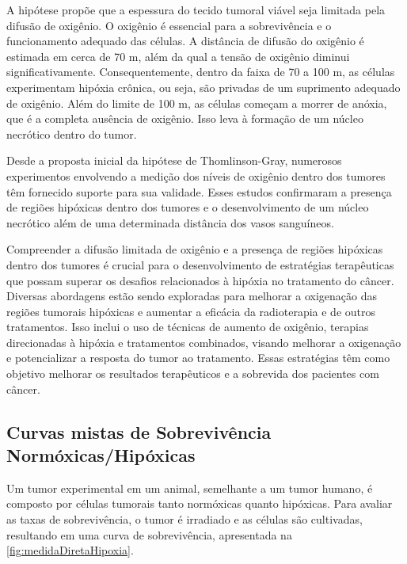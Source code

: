 \documentclass[11pt,a4paper]{article}
\begin{document}
	A hipótese propõe que a espessura do tecido tumoral viável seja limitada pela difusão de oxigênio. O oxigênio é essencial para a sobrevivência e o funcionamento adequado das células. A distância de difusão do oxigênio é estimada em cerca de 70 \mu m, além da qual a tensão de oxigênio diminui significativamente. Consequentemente, dentro da faixa de 70 a 100 \mu m, as células experimentam hipóxia crônica, ou seja, são privadas de um suprimento adequado de oxigênio. Além do limite de 100 \mu m, as células começam a morrer de anóxia, que é a completa ausência de oxigênio. Isso leva à formação de um núcleo necrótico dentro do tumor.

	Desde a proposta inicial da hipótese de Thomlinson-Gray, numerosos experimentos envolvendo a medição dos níveis de oxigênio dentro dos tumores têm fornecido suporte para sua validade. Esses estudos confirmaram a presença de regiões hipóxicas dentro dos tumores e o desenvolvimento de um núcleo necrótico além de uma determinada distância dos vasos sanguíneos.

	Compreender a difusão limitada de oxigênio e a presença de regiões hipóxicas dentro dos tumores é crucial para o desenvolvimento de estratégias terapêuticas que possam superar os desafios relacionados à hipóxia no tratamento do câncer. Diversas abordagens estão sendo exploradas para melhorar a oxigenação das regiões tumorais hipóxicas e aumentar a eficácia da radioterapia e de outros tratamentos. Isso inclui o uso de técnicas de aumento de oxigênio, terapias direcionadas à hipóxia e tratamentos combinados, visando melhorar a oxigenação e potencializar a resposta do tumor ao tratamento. Essas estratégias têm como objetivo melhorar os resultados terapêuticos e a sobrevida dos pacientes com câncer.

\subsection*{Curvas mistas de Sobrevivência Normóxicas/Hipóxicas}

	Um tumor experimental em um animal, semelhante a um tumor humano, é composto por células tumorais tanto normóxicas quanto hipóxicas. Para avaliar as taxas de sobrevivência, o tumor é irradiado e as células são cultivadas, resultando em uma curva de sobrevivência, apresentada na \ref{fig:medidaDiretaHipoxia}.
\end{document}
